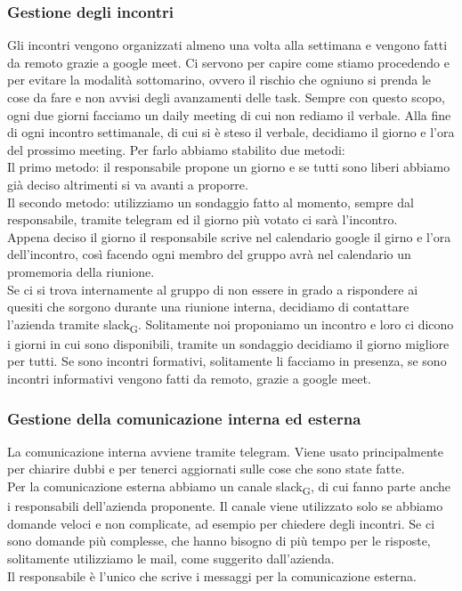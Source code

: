 \documentclass{article}
\begin{document}
\subsubsection{Gestione degli incontri}
Gli incontri vengono organizzati almeno una volta alla settimana e vengono fatti da remoto grazie a google meet. Ci servono per capire come stiamo procedendo e per evitare la modalità sottomarino, ovvero il rischio che ogniuno si prenda le cose da fare e non avvisi degli avanzamenti delle task. Sempre con questo scopo, ogni due giorni facciamo un daily meeting di cui non rediamo il verbale. Alla fine di ogni incontro settimanale, di cui si è steso il verbale, decidiamo il giorno e l'ora del prossimo meeting. Per farlo abbiamo stabilito due metodi: \\
Il primo metodo: il responsabile propone un giorno e se tutti sono liberi abbiamo già deciso altrimenti si va avanti a proporre.\\
Il secondo metodo: utilizziamo un sondaggio fatto al momento, sempre dal responsabile, tramite telegram ed il giorno più votato ci sarà l'incontro. \\
Appena deciso il giorno il responsabile scrive nel calendario google il girno e l'ora dell'incontro, così facendo ogni membro del gruppo avrà nel calendario un promemoria della riunione.\\
Se ci si trova internamente al gruppo di non essere in grado a rispondere ai quesiti che sorgono durante una riunione interna, decidiamo di contattare l'azienda tramite slack\textsubscript{G}. Solitamente noi proponiamo un incontro e loro ci dicono i giorni in cui sono disponibili, tramite un sondaggio decidiamo il giorno migliore per tutti. Se sono incontri formativi, solitamente li facciamo in presenza, se sono incontri informativi vengono fatti da remoto, grazie a google meet. 


\subsubsection{Gestione della comunicazione interna ed esterna}
La comunicazione interna avviene tramite telegram. Viene usato principalmente per chiarire dubbi e per tenerci aggiornati sulle cose che sono state fatte.\\
Per la comunicazione esterna abbiamo un canale slack\textsubscript{G}, di cui fanno parte anche i responsabili dell'azienda proponente. Il canale viene utilizzato solo se abbiamo domande veloci e non complicate, ad esempio per chiedere degli incontri. Se ci sono domande più complesse, che hanno bisogno di più tempo per le risposte, solitamente utilizziamo le mail, come suggerito dall'azienda.\\
Il responsabile è l'unico che scrive i messaggi per la comunicazione esterna. 
\end{document}
